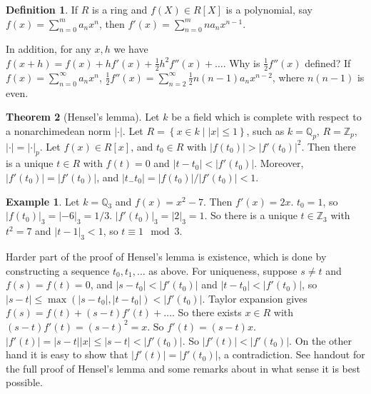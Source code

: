 \documentclass{article}
\newcommand{\Z}{\mathbb{Z}}
\newcommand{\Q}{\mathbb{Q}}
\newcommand{\rb}[1]{\left( #1 \right)}
\renewcommand{\sb}[1]{\left[ #1 \right]}
\newcommand{\cb}[1]{\left\{ #1 \right\}}
\newcommand{\abs}[1]{\left\lvert #1 \right\rvert}
\theoremstyle{definition}\newtheorem{definition}{Definition}[section]
\theoremstyle{definition}\newtheorem{remark}[definition]{Remark}
\theoremstyle{definition}\newtheorem*{example}{Example}
\theoremstyle{definition}\newtheorem*{note}{Note}
\newtheorem{theorem}[definition]{Theorem}
\begin{document}
\begin{definition}
If $ R $ is a ring and $ f\rb{X} \in R\sb{X} $ is a polynomial, say $ f\rb{x} = \sum_{n = 0}^m a_nx^n $, then $ f'\rb{x} = \sum_{n = 0}^m na_nx^{n - 1} $.
\end{definition}

In addition, for any $ x, h $ we have $ f\rb{x + h} = f\rb{x} + hf'\rb{x} + \tfrac{1}{2}h^2f''\rb{x} + \dots $. Why is $ \tfrac{1}{2}f''\rb{x} $ defined? If $ f\rb{x} = \sum_{n = 0}^\infty a_nx^n $, $ \tfrac{1}{2}f''\rb{x} = \sum_{n = 2}^\infty \tfrac{1}{2}n\rb{n - 1}a_nx^{n - 2} $, where $ n\rb{n - 1} $ is even.

\begin{theorem}[Hensel's lemma]
Let $ k $ be a field which is complete with respect to a nonarchimedean norm $ \abs{\cdot} $. Let $ R = \cb{x \in k \mid \abs{x} \le 1} $, such as $ k = \Q_p $, $ R = \Z_p $, $ \abs{\cdot} = \abs{\cdot}_p $. Let $ f\rb{x} \in R\sb{x} $, and $ t_0 \in R $ with $ \abs{f\rb{t_0}} > \abs{f'\rb{t_0}}^2 $. Then there is a unique $ t \in R $ with $ f\rb{t} = 0 $ and $ \abs{t - t_0} < \abs{f'\rb{t_0}} $. Moreover, $ \abs{f'\rb{t_0}} = \abs{f'\rb{t_0}} $, and $ \abs{t_- t_0} = \abs{f\rb{t_0}} / \abs{f'\rb{t_0}} < 1 $.
\end{theorem}

\begin{example}
Let $ k = \Q_3 $ and $ f\rb{x} = x^2 - 7 $. Then $ f'\rb{x} = 2x $. $ t_0 = 1 $, so $ \abs{f\rb{t_0}}_3 = \abs{-6}_3 = 1/ 3 $. $ \abs{f'\rb{t_0}}_3 = \abs{2}_3 = 1 $. So there is a unique $ t \in \Z_3 $ with $ t^2 = 7 $ and $ \abs{t - 1}_3 < 1 $, so $ t \equiv 1 \mod 3 $.
\end{example}

Harder part of the proof of Hensel's lemma is existence, which is done by constructing a sequence $ t_0, t_1, \dots $ as above. For uniqueness, suppose $ s \ne t $ and $ f\rb{s} = f\rb{t} = 0 $, and $ \abs{s - t_0} < \abs{f'\rb{t_0}} $ and $ \abs{t - t_0} < \abs{f'\rb{t_0}} $, so $ \abs{s - t} \le \max\rb{\abs{s - t_0}, \abs{t - t_0}} < \abs{f'\rb{t_0}} $. Taylor expansion gives $ f\rb{s} = f\rb{t} + \rb{s - t}f'\rb{t} + \dots $. So there exists $ x \in R $ with $ \rb{s - t}f'\rb{t} = \rb{s - t}^2 = x $. So $ f'\rb{t} = \rb{s - t}x $. $ \abs{f'\rb{t}} = \abs{s - t}\abs{x} \le \abs{s - t} < \abs{f'\rb{t_0}} $. So $ \abs{f'\rb{t}} < \abs{f'\rb{t_0}} $. On the other hand it is easy to show that $ \abs{f'\rb{t}} = \abs{f'\rb{t_0}} $, a contradiction. See handout for the full proof of Hensel's lemma and some remarks about in what sense it is best possible.
\end{document}

